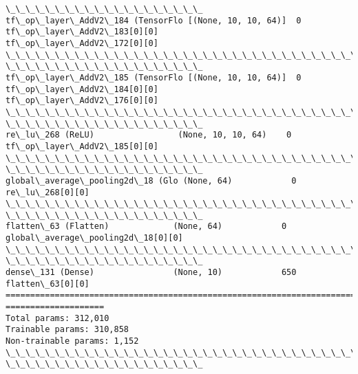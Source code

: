 \documentclass[11pt]{article}
\newcommand{\prompt}[4]{
        {\ttfamily\llap{{\color{#2}[#3]:\hspace{3pt}#4}}\vspace{-\baselineskip}}
    }
\begin{document}
\begin{Verbatim}[commandchars=\\\{\}]
\_\_\_\_\_\_\_\_\_\_\_\_\_\_\_\_\_\_\_\_
tf\_op\_layer\_AddV2\_184 (TensorFlo [(None, 10, 10, 64)]  0
tf\_op\_layer\_AddV2\_183[0][0]
tf\_op\_layer\_AddV2\_172[0][0]
\_\_\_\_\_\_\_\_\_\_\_\_\_\_\_\_\_\_\_\_\_\_\_\_\_\_\_\_\_\_\_\_\_\_\_\_\_\_\_\_\_\_\_\_\_\_\_\_\_\_\_\_\_\_\_\_\_\_\_\_\_\_\_\_\_\_\_\_\_\_\_\_\_\_\_\_\_\_\_\_
\_\_\_\_\_\_\_\_\_\_\_\_\_\_\_\_\_\_\_\_
tf\_op\_layer\_AddV2\_185 (TensorFlo [(None, 10, 10, 64)]  0
tf\_op\_layer\_AddV2\_184[0][0]
tf\_op\_layer\_AddV2\_176[0][0]
\_\_\_\_\_\_\_\_\_\_\_\_\_\_\_\_\_\_\_\_\_\_\_\_\_\_\_\_\_\_\_\_\_\_\_\_\_\_\_\_\_\_\_\_\_\_\_\_\_\_\_\_\_\_\_\_\_\_\_\_\_\_\_\_\_\_\_\_\_\_\_\_\_\_\_\_\_\_\_\_
\_\_\_\_\_\_\_\_\_\_\_\_\_\_\_\_\_\_\_\_
re\_lu\_268 (ReLU)                 (None, 10, 10, 64)    0
tf\_op\_layer\_AddV2\_185[0][0]
\_\_\_\_\_\_\_\_\_\_\_\_\_\_\_\_\_\_\_\_\_\_\_\_\_\_\_\_\_\_\_\_\_\_\_\_\_\_\_\_\_\_\_\_\_\_\_\_\_\_\_\_\_\_\_\_\_\_\_\_\_\_\_\_\_\_\_\_\_\_\_\_\_\_\_\_\_\_\_\_
\_\_\_\_\_\_\_\_\_\_\_\_\_\_\_\_\_\_\_\_
global\_average\_pooling2d\_18 (Glo (None, 64)            0
re\_lu\_268[0][0]
\_\_\_\_\_\_\_\_\_\_\_\_\_\_\_\_\_\_\_\_\_\_\_\_\_\_\_\_\_\_\_\_\_\_\_\_\_\_\_\_\_\_\_\_\_\_\_\_\_\_\_\_\_\_\_\_\_\_\_\_\_\_\_\_\_\_\_\_\_\_\_\_\_\_\_\_\_\_\_\_
\_\_\_\_\_\_\_\_\_\_\_\_\_\_\_\_\_\_\_\_
flatten\_63 (Flatten)             (None, 64)            0
global\_average\_pooling2d\_18[0][0]
\_\_\_\_\_\_\_\_\_\_\_\_\_\_\_\_\_\_\_\_\_\_\_\_\_\_\_\_\_\_\_\_\_\_\_\_\_\_\_\_\_\_\_\_\_\_\_\_\_\_\_\_\_\_\_\_\_\_\_\_\_\_\_\_\_\_\_\_\_\_\_\_\_\_\_\_\_\_\_\_
\_\_\_\_\_\_\_\_\_\_\_\_\_\_\_\_\_\_\_\_
dense\_131 (Dense)                (None, 10)            650
flatten\_63[0][0]
================================================================================
====================
Total params: 312,010
Trainable params: 310,858
Non-trainable params: 1,152
\_\_\_\_\_\_\_\_\_\_\_\_\_\_\_\_\_\_\_\_\_\_\_\_\_\_\_\_\_\_\_\_\_\_\_\_\_\_\_\_\_\_\_\_\_\_\_\_\_\_\_\_\_\_\_\_\_\_\_\_\_\_\_\_\_\_\_\_\_\_\_\_\_\_\_\_\_\_\_\_
\_\_\_\_\_\_\_\_\_\_\_\_\_\_\_\_\_\_\_\_
    \end{Verbatim}
 
            
\prompt{Out}{outcolor}{200}{}
    
    \begin{center}
    \end{center}
    { \hspace*{\fill} \\}
    
\end{document}
